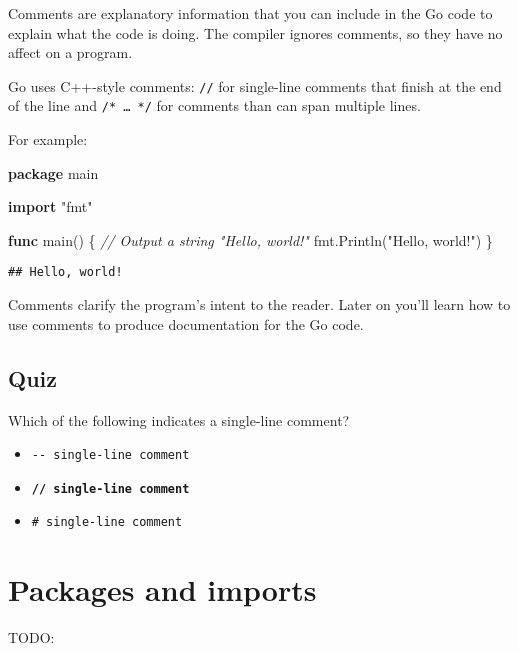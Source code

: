\documentclass[]{book}
\newenvironment{Shaded}{\begin{snugshade}}{\end{snugshade}}
\newcommand{\CommentTok}[1]{\textcolor[rgb]{0.56,0.35,0.01}{\textit{#1}}}
\newcommand{\KeywordTok}[1]{\textcolor[rgb]{0.13,0.29,0.53}{\textbf{#1}}}
\newcommand{\NormalTok}[1]{#1}
\newcommand{\StringTok}[1]{\textcolor[rgb]{0.31,0.60,0.02}{#1}}
\providecommand{\tightlist}{%
  \setlength{\itemsep}{0pt}\setlength{\parskip}{0pt}}
\let\BeginKnitrBlock\begin \let\EndKnitrBlock\end
\begin{document}
Comments are explanatory information that you can include in the Go code to
explain what the code is doing. The compiler ignores comments, so they have no
affect on a program.

Go uses C++-style comments: \texttt{//} for single-line comments that finish at the
end of the line and \texttt{/*~\ldots{}~*/} for comments than can span multiple lines.

For example:

\begin{Shaded}
\begin{Highlighting}[]
\KeywordTok{package}\NormalTok{ main}

\KeywordTok{import} \StringTok{"fmt"}

\KeywordTok{func}\NormalTok{ main() \{}
    \CommentTok{// Output a string "Hello, world!"}
\NormalTok{    fmt.Println(}\StringTok{"Hello, world!"}\NormalTok{)}
\NormalTok{\}}
\end{Highlighting}
\end{Shaded}

\begin{verbatim}
## Hello, world!
\end{verbatim}

\BeginKnitrBlock{rmdnote}
Comments clarify the program's intent to the reader. Later on you'll learn
how to use comments to produce documentation for the Go code.
\EndKnitrBlock{rmdnote}

\hypertarget{quiz-5}{%
\subsection{Quiz}\label{quiz-5}}

Which of the following indicates a single-line comment?

\begin{itemize}
\tightlist
\item
  \texttt{-\/-\ single-line\ comment}
\item
  \textbf{\texttt{//\ single-line\ comment}}
\item
  \texttt{\#\ single-line\ comment}
\end{itemize}

\hypertarget{packages-and-imports}{%
\section{Packages and imports}\label{packages-and-imports}}

TODO:
\end{document}

